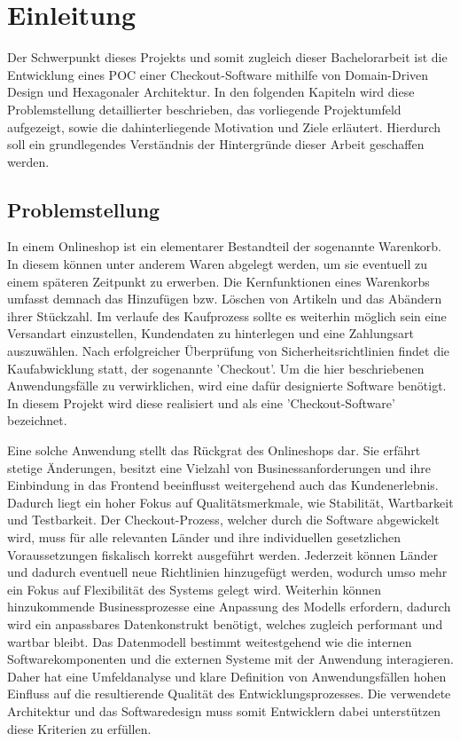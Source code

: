 

\chapter{Einleitung}

Der Schwerpunkt dieses Projekts und somit zugleich dieser Bachelorarbeit ist die Entwicklung eines \acrfull{POC} einer Checkout-Software mithilfe von Domain-Driven Design und Hexagonaler Architektur. In den folgenden Kapiteln wird diese Problemstellung detaillierter beschrieben, das vorliegende Projektumfeld aufgezeigt, sowie die dahinterliegende Motivation und Ziele erläutert. Hierdurch soll ein grundlegendes Verständnis der Hintergründe dieser Arbeit geschaffen werden.

\section{Problemstellung}

In einem Onlineshop ist ein elementarer Bestandteil der sogenannte Warenkorb. In diesem können unter anderem Waren abgelegt werden, um sie eventuell zu einem späteren Zeitpunkt zu erwerben. Die Kernfunktionen eines Warenkorbs umfasst demnach das Hinzufügen bzw. Löschen von Artikeln und das Abändern ihrer Stückzahl. Im verlaufe des Kaufprozess sollte es weiterhin möglich sein eine Versandart einzustellen, Kundendaten zu hinterlegen und eine Zahlungsart auszuwählen. Nach erfolgreicher Überprüfung von Sicherheitsrichtlinien findet die Kaufabwicklung statt, der sogenannte 'Checkout'. Um die hier beschriebenen Anwendungsfälle zu verwirklichen, wird eine dafür designierte Software benötigt. In diesem Projekt wird diese realisiert und als eine 'Checkout-Software' bezeichnet.

Eine solche Anwendung stellt das Rückgrat des Onlineshops dar. Sie erfährt stetige Änderungen, besitzt eine Vielzahl von Businessanforderungen und ihre Einbindung in das Frontend beeinflusst weitergehend auch das Kundenerlebnis. Dadurch liegt ein hoher Fokus auf Qualitätsmerkmale, wie Stabilität, Wartbarkeit und Testbarkeit. Der Checkout-Prozess, welcher durch die Software abgewickelt wird, muss für alle relevanten Länder und ihre individuellen gesetzlichen Voraussetzungen fiskalisch korrekt ausgeführt werden. Jederzeit können Länder und dadurch eventuell neue Richtlinien hinzugefügt werden, wodurch umso mehr ein Fokus auf Flexibilität des Systems gelegt wird. Weiterhin können hinzukommende Businessprozesse eine Anpassung des Modells erfordern, dadurch wird ein anpassbares Datenkonstrukt benötigt, welches zugleich performant und wartbar bleibt. Das Datenmodell bestimmt weitestgehend wie die internen Softwarekomponenten und die externen Systeme mit der Anwendung interagieren. Daher hat eine Umfeldanalyse und klare Definition von Anwendungsfällen hohen Einfluss auf die resultierende Qualität des Entwicklungsprozesses. Die verwendete Architektur und das Softwaredesign muss somit Entwicklern dabei unterstützen diese Kriterien zu erfüllen. 

